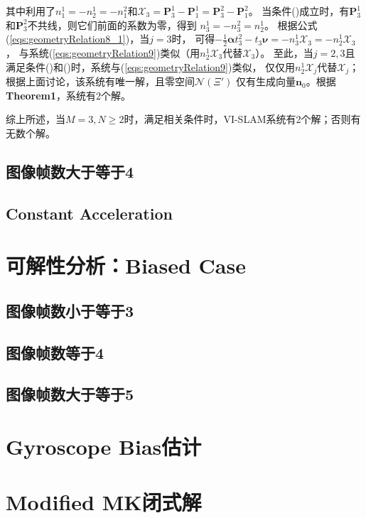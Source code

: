 \documentclass{article}
\begin{document}
其中利用了$n_1^1=-n_2^1=-n_1^2$和$\mathcal{X}_3=\textbf{P}_3^1-\textbf{P}_1^1=\textbf{P}_3^2-\textbf{P}_1^2$。
当条件()成立时，有$\textbf{P}_3^1$和$\textbf{P}_3^2$不共线，则它们前面的系数为零，得到
$n_3^1=-n_3^2=n_2^1$。
根据公式(\ref{eqs:geometryRelation8_1})，当$j=3$时，
可得$-\frac{1}{2}\mathbf{\alpha}t_3^2-t_3\mathbf{\nu}=-n_3^1\mathcal{X}_3=-n_2^1\mathcal{X}_3$，
与系统(\ref{eqs:geometryRelation9})类似（用$n_2^1\mathcal{X}_3$代替$\mathcal{X}_3$）。
至此，当$j=2,3$且满足条件()和()时，系统与(\ref{eqs:geometryRelation9})类似，
仅仅用$n_2^1\mathcal{X}_j$代替$\mathcal{X}_j$；根据上面讨论，该系统有唯一解，且零空间$\mathcal{N}(\Xi')$
仅有生成向量$\textbf{n}_0$。根据\textbf{Theorem1}，系统有2个解。
\par
综上所述，当$M=3,N\geqslant 2$时，满足相关条件时，VI-SLAM系统有2个解；否则有无数个解。


\subsection{图像帧数大于等于4}

\subsection{Constant Acceleration}

\section{可解性分析：Biased Case}
\subsection{图像帧数小于等于3}

\subsection{图像帧数等于4}

\subsection{图像帧数大于等于5}

\section{Gyroscope Bias估计}

\section{Modified MK闭式解}
\end{document}
